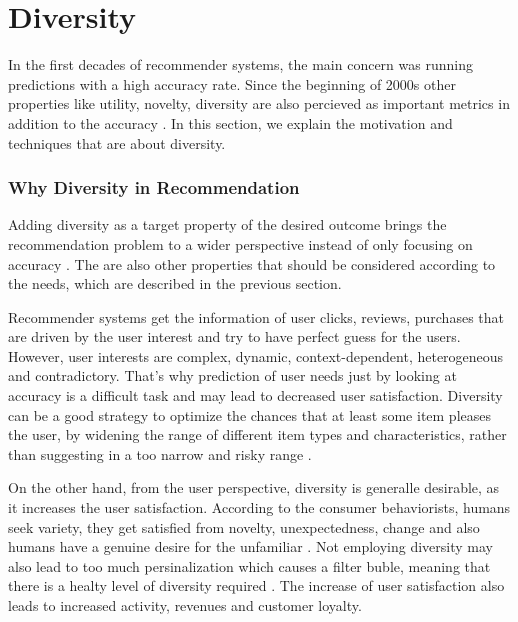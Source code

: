 
\section{Diversity}\label{section:novelty_and_diversity}

In the first decades of recommender systems, the main concern was running predictions with a high accuracy rate. Since the beginning of 2000s other properties like utility, novelty, diversity are also percieved as important metrics in addition to the accuracy \cite{Hurley:2011:NDT:1944339.1944341}. In this section, we explain the motivation and techniques that are about diversity. 

\subsubsection{Why Diversity in Recommendation}

Adding diversity as a target property of the desired outcome brings the recommendation problem to a wider perspective instead of only focusing on accuracy \cite{McNee:2006:AEA:1125451.1125659}. The are also other properties that should be considered according to the needs, which are described in the previous section. 

Recommender systems get the information of user clicks, reviews, purchases that are driven by the user interest and try to have perfect guess for the users. However, user interests are complex, dynamic, context-dependent, heterogeneous and contradictory. That's why prediction of user needs just by looking at accuracy is a difficult task and may lead to decreased user satisfaction. Diversity can be a good strategy to optimize the chances that at least some item pleases the user, by widening the range of different item types and characteristics, rather than suggesting in a too narrow and risky range \cite{castells2015novelty}.

On the other hand, from the user perspective, diversity is generalle desirable, as it increases the user satisfaction. According to the consumer behaviorists, humans seek variety, they get satisfied from novelty, unexpectedness, change and also humans have a genuine desire for the unfamiliar \cite{castells2015novelty}. Not employing diversity may also lead to too much persinalization which causes a filter buble, meaning that there is a healty level of diversity required \cite{Nguyen:2014:EFB:2566486.2568012}. The increase of user satisfaction also leads to increased activity, revenues and customer loyalty.

